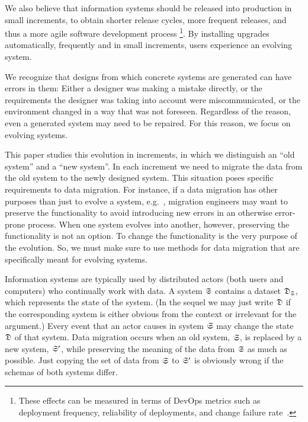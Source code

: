 \documentclass{elsarticle}
\begin{document}
   We also believe that information systems should be released into production in small increments,
   to obtain shorter release cycles, more frequent releases, and thus a more agile software development process%
   \footnote{These effects can be measured in terms of DevOps metrics such as
   deployment frequency,
   reliability of deployments, and
   change failure rate~\cite{DevOps2021}.}.
   By installing upgrades automatically, frequently and in small increments,
   users experience an evolving system.

   We recognize that designs from which concrete systems are generated can have errors in them:
   Either a designer was making a mistake directly,
   or the requirements the designer was taking into account were miscommunicated,
   or the environment changed in a way that was not foreseen.
   Regardless of the reason, even a generated system may need to be repaired.
   For this reason, we focus on evolving systems.
   
   This paper studies this evolution in increments, in which we distinguish an ``old system'' and a ``new system''.
   In each increment we need to migrate the data from the old system to the newly designed system.
   This situation poses specific requirements to data migration.
   For instance, if a data migration has other purposes than just to evolve a system,
   e.g.~\cite{Gholami2016,Bisbal1999},
   migration engineers may want to preserve the functionality to avoid introducing new errors in an otherwise error-prone process.
   When one system evolves into another, however, preserving the functionality is not an option.
   To change the functionality is the very purpose of the evolution.
   So, we must make sure to use methods for data migration that are specifically meant for evolving systems.
   
   Information systems are typically used by distributed actors (both users and computers) who continually work with data.
   A system $\mathfrak{S}$ contains a dataset $\mathfrak{D}_{\mathfrak{S}}$, which represents the state of the system.
   (In the sequel we may just write $\mathfrak{D}$
   if the corresponding system is either obvious from the context or irrelevant for the argument.)
   Every event that an actor causes in system $\mathfrak{S}$ may change the state $\mathfrak{D}$ of that system.
   Data migration occurs when an old system, $\mathfrak{S}$, is replaced by a new system, $\mathfrak{S}'$,
   while preserving the meaning of the data from $\mathfrak{S}$ as much as possible.
   Just copying the set of data from $\mathfrak{S}$ to $\mathfrak{S}'$ is obviously wrong if the schemas of both systems differ.
   
\end{document}

